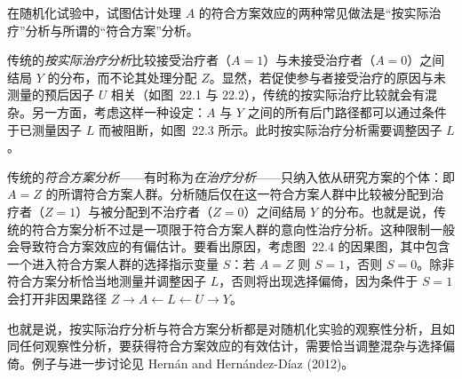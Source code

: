 \begin{finepoint}[朴素的符合方案分析]
在随机化试验中，试图估计处理 $A$ 的符合方案效应的两种常见做法是“按实际治疗”分析与所谓的“符合方案”分析。

传统的\emph{按实际治疗分析}比较接受治疗者（$A=1$）与未接受治疗者（$A=0$）之间结局 $Y$ 的分布，而不论其处理分配 $Z$。显然，若促使参与者接受治疗的原因与未测量的预后因子 $U$ 相关（如图~22.1 与 22.2），传统的按实际治疗比较就会有混杂。另一方面，考虑这样一种设定：$A$ 与 $Y$ 之间的所有后门路径都可以通过条件于已测量因子 $L$ 而被阻断，如图~22.3 所示。此时按实际治疗分析需要调整因子 $L$。

传统的\emph{符合方案分析}——有时称为\emph{在治疗分析}——只纳入依从研究方案的个体：即 $A=Z$ 的所谓符合方案人群。分析随后仅在这一符合方案人群中比较被分配到治疗者（$Z=1$）与被分配到不治疗者（$Z=0$）之间结局 $Y$ 的分布。也就是说，传统的符合方案分析不过是一项限于符合方案人群的意向性治疗分析。这种限制一般会导致符合方案效应的有偏估计。要看出原因，考虑图~22.4 的因果图，其中包含一个进入符合方案人群的选择指示变量 $S$：若 $A=Z$ 则 $S=1$，否则 $S=0$。除非符合方案分析恰当地测量并调整因子 $L$，否则将出现选择偏倚，因为条件于 $S=1$ 会打开非因果路径 $Z\to A\leftarrow L\leftarrow U\to Y$。

也就是说，按实际治疗分析与符合方案分析都是对随机化实验的观察性分析，且如同任何观察性分析，要获得符合方案效应的有效估计，需要恰当调整混杂与选择偏倚。例子与进一步讨论见 Hernán and Hernández-Díaz (2012)。

\begin{center}
\label{fig:22.3}
\end{center}

\begin{center}
\label{fig:22.4}
\end{center}
\end{finepoint}

